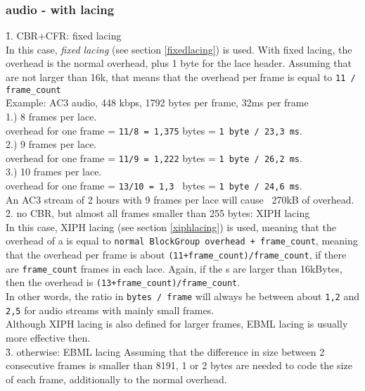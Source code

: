 \documentclass[12pt]{article}
\begin{document}
\subsubsection{audio - with lacing}
\f{1. CBR+CFR: fixed lacing}\\
In this case, \textsl{fixed lacing} (see section \ref{fixedlacing}) is used. With
fixed lacing, the overhead is
the normal  overhead, plus 1 byte for the lace header. Assuming
that  are not larger than 16k, that means that the overhead
per frame is equal to \texttt{11 / frame\_count}\\[0.3cm]
\f{Example:} AC3 audio, 448 kbps, 1792 bytes per frame, 32ms per frame\\
1.)  8 frames per lace.\\
overhead for one frame = \texttt{11/8 = 1,375} bytes = \texttt{1 byte / 23,3 ms}.\\
2.)  9 frames per lace.\\
overhead for one frame = \texttt{11/9 = 1,222} bytes = \texttt{1 byte / 26,2 ms}.\\
3.) 10 frames per lace.\\
overhead for one frame = \texttt{13/10 = 1,3 } bytes = \texttt{1 byte / 24,6 ms}.\\[0.3cm]
An AC3 stream of 2 hours with 9 frames per lace will cause ~270kB of overhead.\\[0.5cm]
\f{2. no CBR, but almost all frames smaller than 255 bytes: XIPH lacing}\\
In this case, XIPH lacing (see section \ref{xiphlacing}) is used, meaning that the overhead of
a  is
equal to \texttt{normal BlockGroup overhead + frame\_count}, meaning that the overhead
per frame is about \texttt{(11+frame\_count)/frame\_count}, if there are \texttt{frame\_count}
frames in each lace. Again, if the s are larger than 16kBytes, then
the overhead is \texttt{(13+frame\_count)/frame\_count}.\\In other words, the ratio in
\texttt{bytes / frame} will always be between about \texttt{1,2} and \texttt{2,5} for
audio streams with mainly small frames.\\[0.2cm]
Although XIPH lacing is also defined for larger frames, EBML lacing is usually more
effective then.\\[0.5cm]
\f{3. otherwise: EBML lacing}
Assuming that the difference in size between 2 consecutive frames is smaller
than 8191, 1 or 2 bytes are needed to code the size of each frame, additionally
to the normal  overhead.\\[0.3cm]
\end{document}
